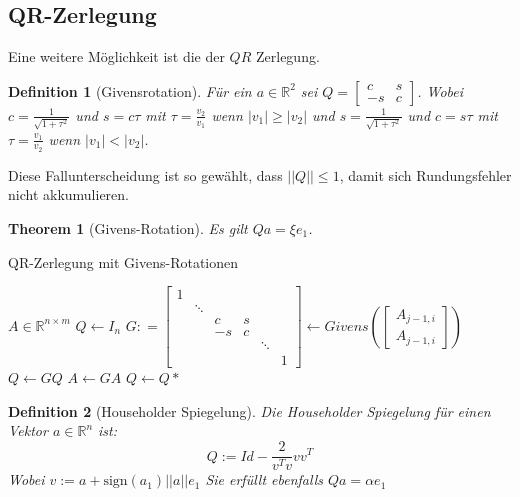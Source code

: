 \documentclass[10pt,a4paper]{article}
\newtheorem{theorem}{Theorem}
\newtheorem{definition}{Definition}
\begin{document}
	\subsection{QR-Zerlegung}
	Eine weitere Möglichkeit ist die der $QR$ Zerlegung. 
	\begin{definition}[Givensrotation]
		Für ein $a \in \mathbb{R}^2$ sei $Q=\begin{bmatrix}
			c & s \\
			-s & c
		\end{bmatrix}$. Wobei $c=\frac{1}{\sqrt{1+\tau^2}}$ und $s=c\tau$ mit $\tau = \frac{v_2}{v_1}$ wenn $|v_1| \geq |v_2|$ und  $s=\frac{1}{\sqrt{1+\tau^2}}$ und $c=s\tau$ mit $\tau = \frac{v_1}{v_2}$ wenn $|v_1| < |v_2|$.
	\end{definition}
	Diese Fallunterscheidung ist so gewählt, dass $||Q||\leq 1$, damit sich Rundungsfehler nicht akkumulieren.
	\begin{theorem}[Givens-Rotation]
		Es gilt $Qa = \xi e_1$.
	\end{theorem}
	\begin{algorithm}[H]
		\caption{QR-Zerlegung mit Givens-Rotationen}
		\begin{algorithmic}
			\Require $A \in \mathbb{R}^{n\times m}$
			\State $Q \leftarrow I_n$
					\State $G : = \begin{bmatrix}
					1 &  &  &  &  &  \\
					& \ddots &  &  &  &  \\
					&  & c & s &  &  \\
					&  & -s & c &  &  \\
					&  &  &  & \ddots &  \\
					&  &  &  &  & 1
				\end{bmatrix} \leftarrow Givens(\begin{bmatrix}
						A_{j-1,i} \\
						A_{j-1,i}
					\end{bmatrix})$
					\State $Q \leftarrow GQ$
					\State $A \leftarrow GA$
				\EndFor
			\EndFor
			\State $Q \leftarrow Q*$
		\end{algorithmic}
	\end{algorithm}
	\begin{definition}[Householder Spiegelung]
		Die Householder Spiegelung für einen Vektor $a \in \mathbb{R}^n$ ist:
		$$Q := Id -\frac{2}{v^Tv}vv^T$$
		Wobei $v :=a+\text{sign}(a_1)||a||e_1$
		Sie erfüllt ebenfalls $Qa = \alpha e_1$
	\end{definition}
\end{document}

